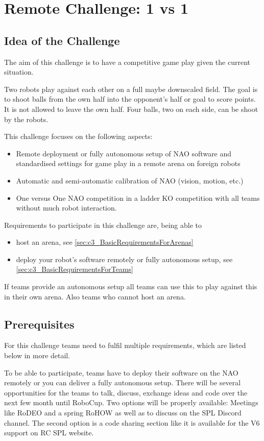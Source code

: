 \section{Remote Challenge: 1 vs 1}
\label{sec:OneVsOneChallenge}

\subsection{Idea of the Challenge}
The aim of this challenge is to have a competitive game play given the current situation. 

Two robots play against each other on a full maybe downscaled field. The goal is to shoot balls from the own half into the opponent's half or goal to score points. It is not allowed to leave the own half. Four balls, two on each side, can be shoot by the robots.

This challenge focuses on the following aspects:
\begin{itemize}
    \item Remote deployment or fully autonomous setup of NAO software and standardised settings for game play in a remote arena on foreign robots
    \item Automatic and semi-automatic calibration of NAO (vision, motion, etc.) 
    \item One versus One NAO competition in a ladder KO competition with all teams without much robot interaction. 
\end{itemize}

Requirements to participate in this challenge are, being able to
\begin{itemize}
	\item host an arena, see \ref{sec:c3_BasicRequirementsForArenas}
	\item deploy your robot's software remotely or fully autonomous setup, see \ref{sec:c3_BasicRequirementsForTeams}
\end{itemize}

If teams provide an autonomous setup all teams can use this to play against this in their own arena. Also teams who cannot host an arena.

\subsection{Prerequisites}
\label{sec:c3_Prerequisites}
For this challenge teams need to fulfil multiple requirements, which are listed below in more detail.

To be able to participate, teams have to deploy their software on the NAO remotely or you can deliver a fully autonomous  setup. There will be several opportunities for the teams to talk, discuss, exchange ideas and code over the next few month until RoboCup. Two options will be properly available: Meetings like RoDEO and a spring RoHOW as well as to discuss on the SPL Discord channel. The second option is a code sharing section like it is available for the V6 support on RC SPL website.

